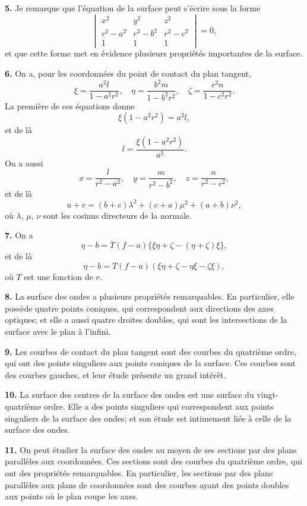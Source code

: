 \documentclass[11pt,a4paper]{book}
\begin{document}
{{{\textbf{5.} Je remarque que l'\'equation de la surface peut s'\'ecrire sous la forme
\[
\begin{vmatrix}
x^2 & y^2 & z^2 \\
r^2-a^2 & r^2-b^2 & r^2-c^2 \\
1 & 1 & 1
\end{vmatrix} = 0,
\]
et que cette forme met en \'evidence plusieurs propri\'et\'es importantes de la surface.

\textbf{6.} On a, pour les coordonn\'ees du point de contact du plan tangent,
\[
\xi = \frac{a^2l}{1-a^2r^2}, \quad \eta = \frac{b^2m}{1-b^2r^2}, \quad \zeta = \frac{c^2n}{1-c^2r^2}.
\]
La premi\`ere de ces \'equations donne
\[
\xi(1-a^2r^2) = a^2l,
\]
et de l\`a
\[
l = \frac{\xi(1-a^2r^2)}{a^2}.
\]
On a aussi
\[
x = \frac{l}{r^2-a^2}, \quad y = \frac{m}{r^2-b^2}, \quad z = \frac{n}{r^2-c^2},
\]
et de l\`a
\[
u + v = (b+c)\lambda^2 + (c+a)\mu^2 + (a+b)\nu^2,
\]
o\`u $\lambda$, $\mu$, $\nu$ sont les cosinus directeurs de la normale.

\newpage
\textbf{7.} On a
\[
\eta - b = T(f-a)\{\xi\eta + \zeta - (\eta + \zeta)\xi\},
\]
et de l\`a
\[
\eta - b = T(f-a)(\xi\eta + \zeta - \eta\xi - \zeta\xi),
\]
o\`u $T$ est une fonction de $r$.

\textbf{8.} La surface des ondes a plusieurs propri\'et\'es remarquables. En
particulier, elle poss\`ede quatre points coniques, qui correspondent aux directions
des axes optiques; et elle a aussi quatre droites doubles, qui sont les intersections
de la surface avec le plan \`a l'infini.

\textbf{9.} Les courbes de contact du plan tangent sont des courbes du quatri\`eme
ordre, qui ont des points singuliers aux points coniques de la surface. Ces courbes
sont des courbes gauches, et leur \'etude pr\'esente un grand int\'er\^et.

\textbf{10.} La surface des centres de la surface des ondes est une surface du
vingt-quatri\`eme ordre. Elle a des points singuliers qui correspondent aux points
singuliers de la surface des ondes; et son \'etude est intimement li\'ee \`a celle de la
surface des ondes.

\textbf{11.} On peut \'etudier la surface des ondes au moyen de ses sections par
des plans parall\`eles aux coordonn\'ees. Ces sections sont des courbes du quatri\`eme
ordre, qui ont des propri\'et\'es remarquables. En particulier, les sections par des
plans parall\`eles aux plans de coordonn\'ees sont des courbes ayant des points doubles
aux points o\`u le plan coupe les axes.

}}}
\end{document}
